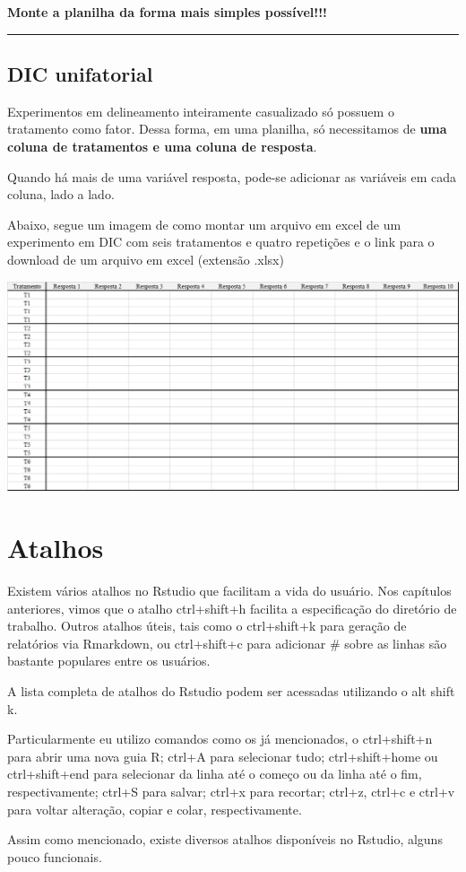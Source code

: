 \documentclass[
]{book}
\begin{document}
\textbf{Monte a planilha da forma mais simples possível!!!}

\begin{center}\rule{0.5\linewidth}{0.5pt}\end{center}

\hypertarget{dic-unifatorial}{%
\section{DIC unifatorial}\label{dic-unifatorial}}

Experimentos em delineamento inteiramente casualizado só possuem o tratamento como fator. Dessa forma, em uma planilha, só necessitamos de \textbf{uma coluna de tratamentos e uma coluna de resposta}.

Quando há mais de uma variável resposta, pode-se adicionar as variáveis em cada coluna, lado a lado.

Abaixo, segue um imagem de como montar um arquivo em excel de um experimento em DIC com seis tratamentos e quatro repetições e o link para o download de um arquivo em excel (extensão .xlsx)

\includegraphics[width=10.41667in,height=\textheight]{dic.png}

\hypertarget{atalhos}{%
\chapter{Atalhos}\label{atalhos}}

Existem vários atalhos no Rstudio que facilitam a vida do usuário. Nos capítulos anteriores, vimos que o atalho ctrl+shift+h facilita a especificação do diretório de trabalho. Outros atalhos úteis, tais como o ctrl+shift+k para geração de relatórios via Rmarkdown, ou ctrl+shift+c para adicionar \# sobre as linhas são bastante populares entre os usuários.

A lista completa de atalhos do Rstudio podem ser acessadas utilizando o alt shift k.

Particularmente eu utilizo comandos como os já mencionados, o ctrl+shift+n para abrir uma nova guia R; ctrl+A para selecionar tudo; ctrl+shift+home ou ctrl+shift+end para selecionar da linha até o começo ou da linha até o fim, respectivamente; ctrl+S para salvar; ctrl+x para recortar; ctrl+z, ctrl+c e ctrl+v para voltar alteração, copiar e colar, respectivamente.

Assim como mencionado, existe diversos atalhos disponíveis no Rstudio, alguns pouco funcionais.

  
\end{document}
